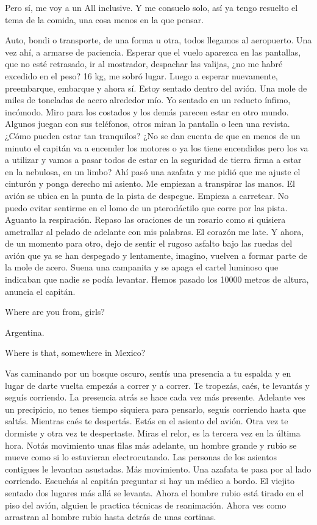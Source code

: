 \documentclass[11pt,twoside,openright,a6paper]{book}
\begin{document}
Pero sí, me voy a un All inclusive. Y me consuelo solo, así ya tengo resuelto el tema de la comida, una cosa menos en la que pensar.


\vspace{1.5cm}
Auto, bondi o transporte, de una forma u otra, todos llegamos al aeropuerto. Una vez ahí, a armarse de paciencia. Esperar que el vuelo aparezca en las pantallas, que no esté retrasado, ir al mostrador, despachar las valijas, ¿no me habré excedido en el peso? 16 kg, me sobró lugar. Luego a esperar nuevamente, preembarque, embarque y ahora sí. Estoy sentado dentro del avión. Una mole de miles de toneladas de acero alrededor mío. Yo sentado en un reducto ínfimo, incómodo. Miro para los costados y los demás parecen estar en otro mundo. Algunos juegan con sus teléfonos, otros miran la pantalla o leen una revista. ¿Cómo pueden estar tan tranquilos? ¿No se dan cuenta de que en menos de un minuto el capitán va a encender los motores o ya los tiene encendidos pero los va a utilizar y vamos a pasar todos de estar en la seguridad de tierra firma a estar en la nebulosa, en un limbo? Ahí pasó una azafata y me pidió que me ajuste el cinturón y ponga derecho mi asiento. Me empiezan a transpirar las manos. El avión se ubica en la punta de la pista de despegue. Empieza a carretear. No puedo evitar sentirme en el lomo de un pterodáctilo que corre por las pista. Aguanto la respiración. Repaso las oraciones de un rosario como si quisiera ametrallar al pelado de adelante con mis palabras. El corazón me late. Y ahora, de un momento para otro, dejo de sentir el rugoso asfalto bajo las ruedas del avión que ya se han despegado y lentamente, imagino, vuelven a formar parte de la mole de acero. Suena una campanita y se apaga el cartel luminoso que indicaban que nadie se podía levantar. Hemos pasado los 10000 metros de altura, anuncia el capitán.


\vspace{1.5cm}
Where are you from, girls?

Argentina.

Where is that, somewhere in Mexico?


\vspace{1.5cm}
Vas caminando por un bosque oscuro, sentís una presencia a tu espalda y en lugar de darte vuelta empezás a correr y a correr. Te tropezás, caés, te levantás y seguís corriendo. La presencia atrás se hace cada vez más presente. Adelante ves un precipicio, no tenes tiempo siquiera para pensarlo, seguís corriendo hasta que saltás. Mientras caés te despertás. Estás en el asiento del avión. Otra vez te dormiste y otra vez te despertaste. Miras el relor, es la tercera vez en la última hora. Notás movimiento unas filas más adelante, un hombre grande y rubio se mueve  como si lo estuvieran electrocutando. Las personas de los asientos contigues le levantan asustadas. Más movimiento. Una azafata te pasa por al lado corriendo. Escuchás al capitán preguntar si hay un médico a bordo. El viejito sentado dos lugares más allá se levanta. Ahora el hombre rubio está tirado en el piso del avión, alguien le practica técnicas de reanimación. Ahora ves como arrastran al hombre rubio hasta detrás de unas cortinas.
\end{document}
